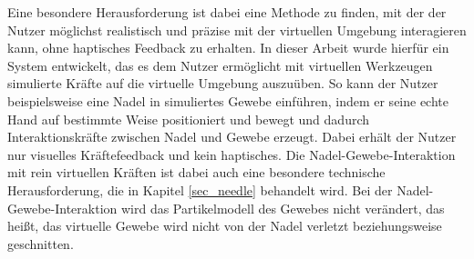 Eine besondere Herausforderung ist dabei eine Methode zu finden, mit der der Nutzer möglichst realistisch und präzise mit der virtuellen Umgebung interagieren kann, ohne haptisches Feedback zu erhalten. In dieser Arbeit wurde hierfür ein System entwickelt, das es dem Nutzer ermöglicht mit virtuellen Werkzeugen simulierte Kräfte auf die virtuelle Umgebung auszuüben. So kann der Nutzer beispielsweise eine Nadel in simuliertes Gewebe einführen, indem er seine echte Hand auf bestimmte Weise positioniert und bewegt und dadurch Interaktionskräfte zwischen Nadel und Gewebe erzeugt. 
Dabei erhält der Nutzer nur visuelles Kräftefeedback und kein haptisches. %
Die Nadel-Gewebe-Interaktion mit rein virtuellen Kräften ist dabei auch eine besondere technische Herausforderung, die in Kapitel \ref{sec_needle} behandelt wird. 
Bei der Nadel-Gewebe-Interaktion wird das Partikelmodell des Gewebes nicht verändert, das heißt, das virtuelle Gewebe wird nicht von der Nadel verletzt beziehungsweise geschnitten.




